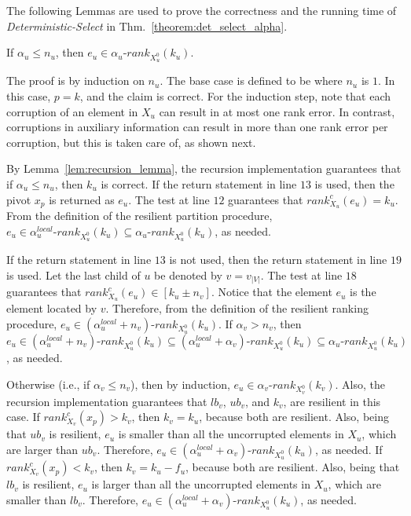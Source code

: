 \documentclass{llncs}
\begin{document}
The following Lemmas are used to prove the correctness and the running time of \emph{Deterministic-Select} in Thm.~\ref{theorem:det_select_alpha}.




\begin{lemma}
\label{lem:analysis_1}
If $\alpha_u \leq n_u$, then $e_u \in \alpha_u\text{-}rank_{X_u^0}(k_u)$.
\end{lemma}

\begin{pf}
The proof is by induction on $n_u$. The base case is defined to be where $n_u$ is $1$. In this case, $p = k$, and the claim is correct. For the induction step, note that each corruption of an element in $X_u$ can result in at most one rank error. In contrast, corruptions in auxiliary information can result in more than one rank error per corruption, but this is taken care of, as shown next.

By Lemma~\ref{lem:recursion_lemma}, the recursion implementation guarantees that if $\alpha_u \leq n_u$, then $k_u$ is correct. If the return statement in line $13$ is used, then the pivot $x_p$ is returned as $e_u$. The test at line $12$ guarantees that $rank^c_{X_u}(e_u) = k_u$. From the definition of the resilient partition procedure, $e_u \in \alpha_u^{local}\text{-}rank_{X_u^0}(k_u) \subseteq \alpha_u\text{-}rank_{X_u^0}(k_u)$, as needed.

If the return statement in line $13$ is not used, then the return statement in line $19$ is used. Let the last child of $u$ be denoted by $v = v_{|V|}$. The test at line $18$ guarantees that $rank^c_{X_u}(e_u) \in [k_u \pm n_v]$. Notice that the element $e_u$ is the element located by $v$. Therefore, from the definition of the resilient ranking procedure, $e_u \in (\alpha_u^{local} + n_v)\text{-}rank_{X_u^0}(k_u)$. If $\alpha_v > n_v$, then $e_u \in (\alpha_u^{local} + n_v)\text{-}rank_{X_u^0}(k_u) \subseteq (\alpha_u^{local} + \alpha_v)\text{-}rank_{X_u^0}(k_u) \subseteq \alpha_u\text{-}rank_{X_u^0}(k_u)$, as needed.

Otherwise (i.e., if $\alpha_v \leq n_v$), then by induction, $e_u \in \alpha_v\text{-}rank_{X_v^0}(k_v)$. Also, the recursion implementation guarantees that $lb_v$, $ub_v$, and $k_v$, are resilient in this case. If $rank^c_{X_v}(x_p) > k_v$, then $k_v = k_u$, because both are resilient. Also, being that $ub_v$ is resilient, $e_u$ is smaller than all the uncorrupted elements in $X_u$, which are larger than $ub_v$. Therefore, $e_u \in (\alpha_u^{local} + \alpha_v)\text{-}rank_{X_u^0}(k_u)$, as needed. If $rank^c_{X_v}(x_p) < k_v$, then $k_v = k_u - f_u$, because both are resilient. Also, being that $lb_v$ is resilient, $e_u$ is larger than all the uncorrupted elements in $X_u$, which are smaller than $lb_v$. Therefore, $e_u \in (\alpha_u^{local} + \alpha_v)\text{-}rank_{X_u^0}(k_u)$, as needed.
\end{pf}
\end{document}
